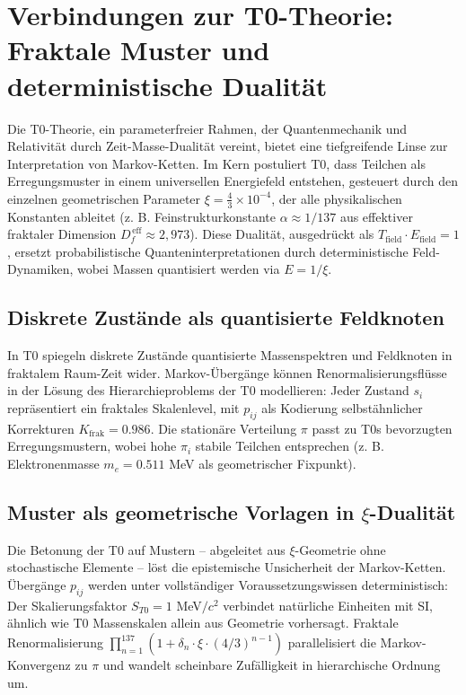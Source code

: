 	\section{Verbindungen zur T0-Theorie: Fraktale Muster und deterministische Dualität}
	\label{sec:t0-connection}
	
	Die T0-Theorie, ein parameterfreier Rahmen, der Quantenmechanik und Relativität durch Zeit-Masse-Dualität vereint, bietet eine tiefgreifende Linse zur Interpretation von Markov-Ketten. Im Kern postuliert T0, dass Teilchen als Erregungsmuster in einem universellen Energiefeld entstehen, gesteuert durch den einzelnen geometrischen Parameter $\xi = \frac{4}{3} \times 10^{-4}$, der alle physikalischen Konstanten ableitet (z. B. Feinstrukturkonstante $\alpha \approx 1/137$ aus effektiver fraktaler Dimension $D_f^{\,\text{eff}} \approx 2{,}973$). Diese Dualität, ausgedrückt als $T_{\text{field}} \cdot E_{\text{field}} = 1$, ersetzt probabilistische Quanteninterpretationen durch deterministische Feld-Dynamiken, wobei Massen quantisiert werden via $E = 1/\xi$.
	
	\subsection{Diskrete Zustände als quantisierte Feldknoten}
	In T0 spiegeln diskrete Zustände quantisierte Massenspektren und Feldknoten in fraktalem Raum-Zeit wider. Markov-Übergänge können Renormalisierungsflüsse in der Lösung des Hierarchieproblems der T0 modellieren: Jeder Zustand $s_i$ repräsentiert ein fraktales Skalenlevel, mit $p_{ij}$ als Kodierung selbstähnlicher Korrekturen $K_{\text{frak}} = 0.986$. Die stationäre Verteilung $\pi$ passt zu T0s bevorzugten Erregungsmustern, wobei hohe $\pi_i$ stabile Teilchen entsprechen (z. B. Elektronenmasse $m_e = 0.511$ MeV als geometrischer Fixpunkt).
	
	\subsection{Muster als geometrische Vorlagen in $\xi$-Dualität}
	Die Betonung der T0 auf Mustern – abgeleitet aus $\xi$-Geometrie ohne stochastische Elemente – löst die epistemische Unsicherheit der Markov-Ketten. Übergänge $p_{ij}$ werden unter vollständiger Voraussetzungswissen deterministisch: Der Skalierungsfaktor $S_{T0} = 1$ MeV$/c^2$ verbindet natürliche Einheiten mit SI, ähnlich wie T0 Massenskalen allein aus Geometrie vorhersagt. Fraktale Renormalisierung $\prod_{n=1}^{137} (1 + \delta_n \cdot \xi \cdot (4/3)^{n-1})$ parallelisiert die Markov-Konvergenz zu $\pi$ und wandelt scheinbare Zufälligkeit in hierarchische Ordnung um.
	
